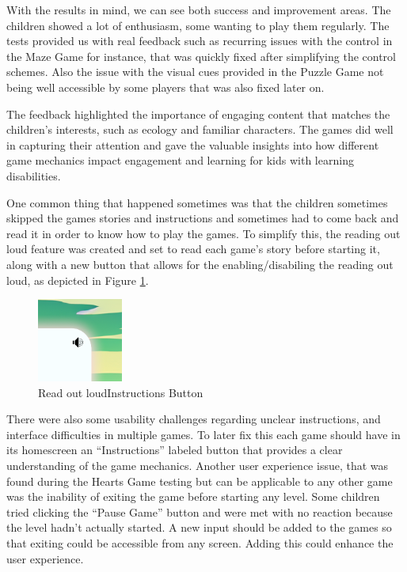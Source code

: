 With the results in mind, we can see both success and improvement areas. The children showed a lot of enthusiasm, some wanting to play them regularly. The tests provided us with real feedback such as recurring issues with the control in the Maze Game for instance, that was quickly fixed after simplifying the control schemes. Also the issue with the visual cues provided in the Puzzle Game not being well accessible by some players that was also fixed later on.


The feedback highlighted the importance of engaging content that matches the children’s interests, such as ecology and familiar characters. The games did well in capturing their attention and gave the valuable insights into how different game mechanics impact engagement and learning for kids with learning disabilities.

One common thing that happened sometimes was that the children sometimes skipped the games stories and instructions and sometimes had to come back and read it in order to know how to play the games. To simplify this, the reading out loud feature was created and set to read each game's story before starting it, along with a new button that allows for the enabling/disabiling the reading out loud, as depicted in Figure \ref{fig:readInstructionsButton}.

\begin{figure}[!h]
    \centering
    \includegraphics[width=0.3\linewidth]{Chapters/game_changes/read-sound-icon.png}
    \caption{Read out loudInstructions Button}
    \label{fig:readInstructionsButton}
\end{figure}


There were also some usability challenges regarding unclear instructions, and interface difficulties in multiple games. To later fix this each game should have in its homescreen an ``Instructions'' labeled button that provides a clear understanding of the game mechanics. Another user experience issue, that was found during the Hearts Game testing but can be applicable to any other game was the inability of exiting the game before starting any level. Some children tried clicking the ``Pause Game'' button and were met with no reaction because the level hadn't actually started. A new input should be added to the games so that exiting could be accessible from any screen. Adding this could enhance the user experience.

